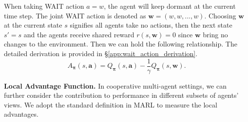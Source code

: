 \documentclass[11pt]{article}
\theoremstyle{plain}
\theoremstyle{remark}
\begin{document}
When taking WAIT action $a = w$, the agent will keep dormant at the current time step. The joint WAIT action is denoted as $\boldsymbol{w} = (w, w, ..., w) $. Choosing $\boldsymbol{w}$ at the current state $s$ signifies all agents take no actions, then the next state $s'=s$ and the agents receive shared reward $r(s, \boldsymbol{w})=0$ since $\boldsymbol{w}$ bring no changes to the environment. Then we can hold the following relationship. The detailed derivation is provided in \S\ref{app:wait_action_derivation}.
\begin{equation}
\label{equ:joint_adv}
A_{\boldsymbol{\pi}}(s, \boldsymbol{a})=Q_{\boldsymbol{\pi}}(s, \boldsymbol{a}) - \frac{1}{\gamma}Q_{\boldsymbol{\pi}}(s, \boldsymbol{w}).
\end{equation}

\textbf{Local Advantage Function.} In cooperative multi-agent settings, we can further consider the contribution to performance in different subsets of agents' views. We adopt the standard definition in MARL to measure the local advantages.
\end{document}
